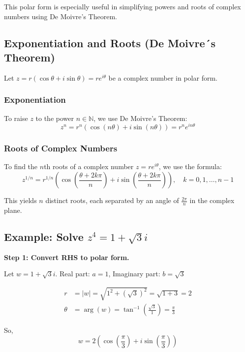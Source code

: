 This polar form is especially useful in simplifying powers and roots of complex numbers using De Moivre’s Theorem.

\subsection{Exponentiation and Roots (De Moivre´s Theorem)}

Let \( z = r(\cos \theta + i \sin \theta) = re^{i\theta} \) be a complex number in polar form.

\subsubsection{Exponentiation}

To raise \( z \) to the power \( n \in \mathbb{N} \), we use De Moivre’s Theorem:
\[
	z^n = r^n (\cos(n\theta) + i \sin(n\theta)) = r^n e^{in\theta}
\]

\subsubsection{Roots of Complex Numbers}

To find the \( n \)th roots of a complex number \( z = r e^{i\theta} \), we use the formula:
\[
	z^{1/n} = r^{1/n} \left( \cos\left( \frac{\theta + 2k\pi}{n} \right) + i \sin\left( \frac{\theta + 2k\pi}{n} \right) \right), \quad k = 0, 1, \ldots, n-1
\]

This yields \( n \) distinct roots, each separated by an angle of \( \frac{2\pi}{n} \) in the complex plane.

\subsection{Example: Solve \texorpdfstring{\( z^4 = 1 + \sqrt{3}i \)}{}}

\textbf{Step 1: Convert RHS to polar form.}

Let \( w = 1 + \sqrt{3}i \).
Real part: \( a = 1 \), Imaginary part: \( b = \sqrt{3} \)

\begin{align*}
	r      & = |w| = \sqrt{1^2 + {(\sqrt{3})}^2} = \sqrt{1 + 3} = 2                    \\
	\theta & = \arg(w) = \tan^{-1} \left( \frac{\sqrt{3}}{1} \right) = \frac{\pi}{3}
\end{align*}

So,
\[
	w = 2 \left( \cos\left( \frac{\pi}{3} \right) + i \sin\left( \frac{\pi}{3} \right) \right)
\]

